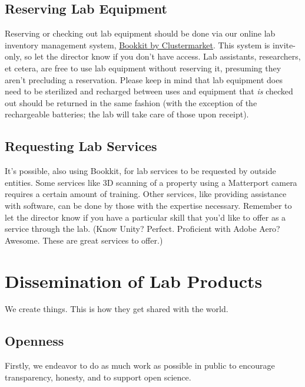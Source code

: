 \documentclass[
]{book}
\begin{document}
\hypertarget{reserving-lab-equipment}{%
\section{Reserving Lab Equipment}\label{reserving-lab-equipment}}

Reserving or checking out lab equipment should be done via our online lab inventory management system, \href{https://www.clustermarket.com}{Bookkit by Clustermarket}. This system is invite-only, so let the director know if you don't have access. Lab assistants, researchers, et cetera, are free to use lab equipment without reserving it, presuming they aren't precluding a reservation. Please keep in mind that lab equipment does need to be sterilized and recharged between uses and equipment that \emph{is} checked out should be returned in the same fashion (with the exception of the rechargeable batteries; the lab will take care of those upon receipt).

\hypertarget{requesting-lab-services}{%
\section{Requesting Lab Services}\label{requesting-lab-services}}

It's possible, also using Bookkit, for lab services to be requested by outside entities. Some services like 3D scanning of a property using a Matterport camera requires a certain amount of training. Other services, like providing assistance with software, can be done by those with the expertise necessary. Remember to let the director know if you have a particular skill that you'd like to offer as a service through the lab. (Know Unity? Perfect. Proficient with Adobe Aero? Awesome. These are great services to offer.)

\hypertarget{diss}{%
\chapter{Dissemination of Lab Products}\label{diss}}

We create things. This is how they get shared with the world.

\hypertarget{openness}{%
\section{Openness}\label{openness}}

Firstly, we endeavor to do as much work as possible in public to encourage transparency, honesty, and to support open science.
\end{document}
